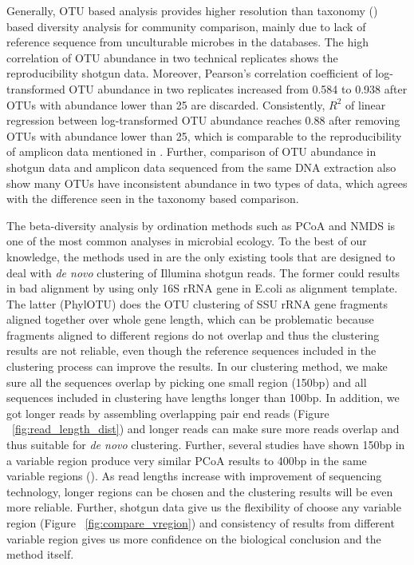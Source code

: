 \documentclass[12pt]{article}
\begin{document}
  Generally, OTU based analysis provides higher resolution than taxonomy (\cite{patotuasse2011}) based diversity analysis for community comparison, mainly due to lack of reference sequence from unculturable microbes in the databases. The high correlation of OTU abundance in two technical replicates shows the reproducibility shotgun data. Moreover, Pearson’s correlation coefficient of log-transformed OTU abundance in two replicates increased from 0.584 to 0.938 after OTUs with abundance lower than 25 are discarded. Consistently, $R^2$ of linear regression between log-transformed OTU abundance reaches 0.88 after removing OTUs with abundance lower than 25, which is comparable to the reproducibility of amplicon data mentioned in \cite{arabdopsis}. Further, comparison of OTU abundance in shotgun data and amplicon data sequenced from the same DNA extraction also show many OTUs have inconsistent abundance in two types of data, which agrees with the difference seen in the taxonomy based comparison.

  The beta-diversity analysis by ordination methods such as PCoA and NMDS is one of the most common analyses in microbial ecology. To the best of our knowledge, the methods used in \cite{kostas2013,phylotu} are the only existing tools that are designed to deal with {\em de novo} clustering of Illumina shotgun reads. The former could results in bad alignment by using only 16S rRNA gene in E.coli as alignment template. The latter (PhylOTU) does the OTU clustering of SSU rRNA gene fragments aligned together over whole gene length, which can be problematic because fragments aligned to different regions do not overlap and thus the clustering results are not reliable, even though the reference sequences included in the clustering process can improve the results. In our clustering method, we make sure all the sequences overlap by picking one small region (150bp) and all sequences included in clustering have lengths longer than 100bp. In addition, we got longer reads by assembling overlapping pair end reads (Figure ~\ref{fig:read_length_dist}) and longer reads can make sure more reads overlap and thus suitable for {\em de novo} clustering. Further, several studies have shown 150bp in a variable region produce very similar PCoA results to 400bp in the same variable regions (\cite{robknight2007,caporaso2012miseq}). As read lengths increase with improvement of sequencing technology, longer regions can be chosen and the clustering results will be even more reliable. Further, shotgun data give us the flexibility of choose any variable region (Figure ~\ref{fig:compare_vregion}) and consistency of results from different variable region gives us more confidence on the biological conclusion and the method itself.
\end{document}
